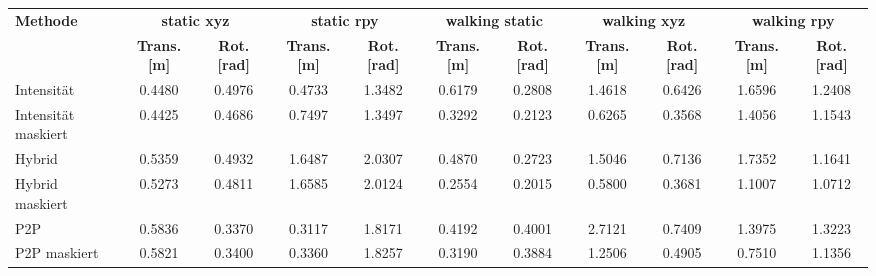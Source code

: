 \begin{tabular}{l*{10}{c}}
\toprule
    \multirow{2}{*}{\textbf{Methode}} & \multicolumn{2}{c}{\textbf{static xyz}} & \multicolumn{2}{c}{\textbf{static rpy}} & \multicolumn{2}{c}{\textbf{walking static}} & \multicolumn{2}{c}{\textbf{walking xyz}} & \multicolumn{2}{c}{\textbf{walking rpy}} \\
\cmidrule(lr){2-3}  \cmidrule(lr){4-5}  \cmidrule(lr){6-7}  \cmidrule(lr){8-9}  \cmidrule(lr){10-11}
    & \textbf{Trans. [m]} & \textbf{Rot. [rad]} & \textbf{Trans. [m]} & \textbf{Rot. [rad]} & \textbf{Trans. [m]} & \textbf{Rot. [rad]} & \textbf{Trans. [m]} & \textbf{Rot. [rad]} & \textbf{Trans. [m]} & \textbf{Rot. [rad]} \\
\midrule
Intensität  & 0.4480 & 0.4976 & 0.4733 & 1.3482 & 0.6179 & 0.2808 & 1.4618 & 0.6426 & 1.6596 & 1.2408 \\
Intensität maskiert & 0.4425 & 0.4686 & 0.7497 & 1.3497 & 0.3292 & 0.2123 & 0.6265 & 0.3568 & 1.4056 & 1.1543 \\
Hybrid  & 0.5359 & 0.4932 & 1.6487 & 2.0307 & 0.4870 & 0.2723 & 1.5046 & 0.7136 & 1.7352 & 1.1641 \\
Hybrid maskiert & 0.5273 & 0.4811 & 1.6585 & 2.0124 & 0.2554 & 0.2015 & 0.5800 & 0.3681 & 1.1007 & 1.0712 \\
P2P  & 0.5836 & 0.3370 & 0.3117 & 1.8171 & 0.4192 & 0.4001 & 2.7121 & 0.7409 & 1.3975 & 1.3223 \\
P2P maskiert & 0.5821 & 0.3400 & 0.3360 & 1.8257 & 0.3190 & 0.3884 & 1.2506 & 0.4905 & 0.7510 & 1.1356 \\
\bottomrule
\end{tabular}
